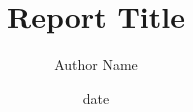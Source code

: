 \documentclass[11pt,a4paper]{style}
\title{Report Title}
\author{Author Name}
\date{date}
\begin{document}
\maketitle

\newpage
\thispagestyle{plain}

\newpage
\begin{singlespacing}
	\tableofcontents
\end{singlespacing}

\renewcommand{\baselinestretch}{2.0}

\newpage
{}
\setcounter{page}{1}
\onehalfspacing



\newpage
\singlespacing%

\end{document}

